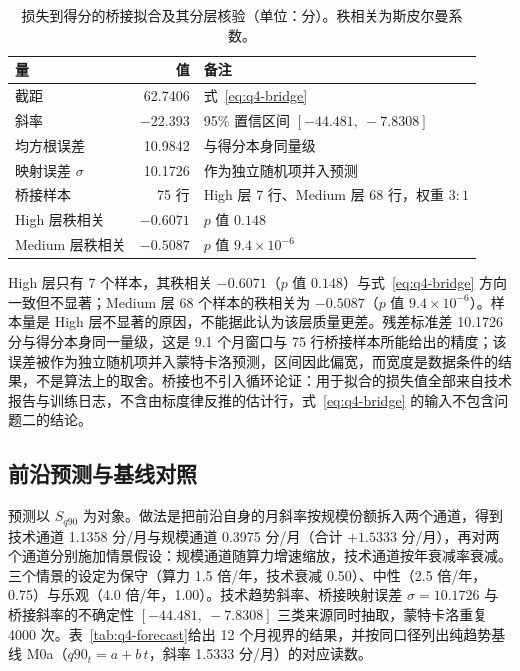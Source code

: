 \begin{table}[H]
  \centering
  \caption{损失到得分的桥接拟合及其分层核验（单位：分）。秩相关为斯皮尔曼系数。}
  \label{tab:q4-bridge}
  \begin{tabular}{@{}lrl@{}}
    \toprule
    量 & 值 & 备注 \\
    \midrule
    截距 & 62.7406 & 式~\eqref{eq:q4-bridge} \\
    斜率 & $-22.393$ & 95\% 置信区间 $[-44.481,\ -7.8308]$ \\
    均方根误差 & 10.9842 & 与得分本身同量级 \\
    映射误差 $\sigma$ & 10.1726 & 作为独立随机项并入预测 \\
    桥接样本 & 75 行 & High 层 7 行、Medium 层 68 行，权重 $3:1$ \\
    High 层秩相关 & $-0.6071$ & $p$ 值 $0.148$ \\
    Medium 层秩相关 & $-0.5087$ & $p$ 值 $9.4\times10^{-6}$ \\
    \bottomrule
  \end{tabular}
\end{table}

High 层只有 7 个样本，其秩相关 $-0.6071$（$p$ 值 $0.148$）与式~\eqref{eq:q4-bridge} 方向一致但不显著；Medium 层 68 个样本的秩相关为 $-0.5087$（$p$ 值 $9.4\times10^{-6}$）。样本量是 High 层不显著的原因，不能据此认为该层质量更差。残差标准差 10.1726 分与得分本身同一量级，这是 9.1 个月窗口与 75 行桥接样本所能给出的精度；该误差被作为独立随机项并入蒙特卡洛预测，区间因此偏宽，而宽度是数据条件的结果，不是算法上的取舍。桥接也不引入循环论证：用于拟合的损失值全部来自技术报告与训练日志，不含由标度律反推的估计行，式~\eqref{eq:q4-bridge} 的输入不包含问题二的结论。

\subsection{前沿预测与基线对照}
\label{subsec:q4-forecast}

预测以 $S_{q90}$ 为对象。做法是把前沿自身的月斜率按规模份额拆入两个通道，得到技术通道 1.1358 分/月与规模通道 0.3975 分/月（合计 $+1.5333$ 分/月），再对两个通道分别施加情景假设：规模通道随算力增速缩放，技术通道按年衰减率衰减。三个情景的设定为保守（算力 1.5 倍/年，技术衰减 0.50）、中性（2.5 倍/年，0.75）与乐观（4.0 倍/年，1.00）。技术趋势斜率、桥接映射误差 $\sigma=10.1726$ 与桥接斜率的不确定性 $[-44.481,\ -7.8308]$ 三类来源同时抽取，蒙特卡洛重复 4000 次。表~\ref{tab:q4-forecast}给出 12 个月视界的结果，并按同口径列出纯趋势基线 M0a（$q90_t = a + b\,t$，斜率 1.5333 分/月）的对应读数。

